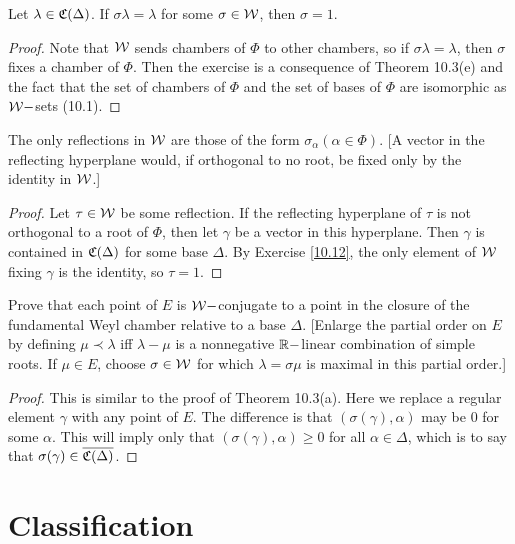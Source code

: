 \begin{ex}\label{10.12}
  Let $\lambda\in\mathfrak{C}(\Delta)$. If $\sigma\lambda=\lambda$ for some $\sigma\in{\cal W}$, then $\sigma = 1$.
\end{ex}
\begin{proof}
  Note that ${\cal W}$ sends chambers of $\Phi$ to other chambers, so if $\sigma\lambda=\lambda$, then $\sigma$ fixes a chamber of $\Phi$. Then the exercise is a consequence of Theorem 10.3(e) and the fact that the set of chambers of $\Phi$ and the set of bases of $\Phi$ are isomorphic as ${\cal W}-$sets (10.1).
\end{proof}

\begin{ex}
  The only reflections in ${\cal W}$ are those of the form $\sigma_{\alpha}(\alpha\in\Phi)$. [A vector in the reflecting hyperplane would, if orthogonal to no root, be fixed only by the identity in ${\cal W}$.]
\end{ex}
\begin{proof}
  Let $\tau \in {\cal W}$ be some reflection. If the reflecting hyperplane of $\tau$ is not orthogonal to a root of $\Phi$, then let $\gamma$ be a vector in this hyperplane. Then $\gamma$ is contained in $\mathfrak{C}(\Delta)$ for some base $\Delta$. By Exercise \ref{10.12}, the only element of ${\cal W}$ fixing $\gamma$ is the identity, so $\tau = 1$.
\end{proof}

\begin{ex}
  Prove that each point of $E$ is ${\cal W}-$conjugate to a point in the closure of the fundamental Weyl chamber relative to a base $\Delta$. [Enlarge the partial order on $E$ by defining $\mu\prec\lambda$ iff $\lambda-\mu$ is a nonnegative ${\mathbb R}-$linear combination of simple roots. If $\mu\in E$, choose $\sigma\in{\cal W}$ for which $\lambda=\sigma\mu$ is maximal in this partial order.]
\end{ex}
\begin{proof}
  This is similar to the proof of Theorem 10.3(a). Here we replace a regular element $\gamma$ with any point of $E$. The difference is that $(\sigma(\gamma),\alpha)$ may be $0$ for some $\alpha$. This will imply only that $(\sigma(\gamma),\alpha)\geqslant0$ for all $\alpha \in\Delta$, which is to say that $\sigma(\gamma) \in \overline{\mathfrak{C}(\Delta)}$.
\end{proof}

\section{Classification}


